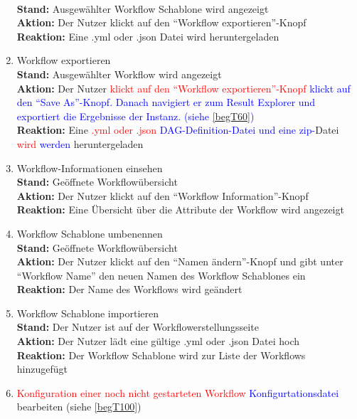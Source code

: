 \begin{enumerate}
        \\ \textbf{Stand:} Ausgewählter \gls{Workflow Schablone} wird angezeigt
        \\ \textbf{Aktion:} Der \gls{Nutzer} klickt auf den \enquote{Workflow exportieren}-Knopf
        \\ \textbf{Reaktion:} Eine .yml oder .json Datei wird heruntergeladen
    \item \gls{Workflow} exportieren
        \\ \textbf{Stand:} Ausgewählter \gls{Workflow} wird angezeigt
        \\ \textbf{Aktion:} Der \gls{Nutzer} \textcolor{red}{klickt auf den \enquote{Workflow exportieren}-Knopf} \textcolor{blue}{klickt auf den \enquote{Save As}-Knopf. Danach navigiert er zum Result Explorer und exportiert die Ergebnisse der Instanz. (siehe \ref{begT60})}
        \\ \textbf{Reaktion:} Eine \textcolor{red}{.yml oder .json} \textcolor{blue}{DAG-Definition-Datei und eine zip-}Datei \textcolor{red}{wird} \textcolor{blue}{werden} heruntergeladen
    \item \gls{Workflow}-Informationen einsehen
        \\ \textbf{Stand:} Geöffnete Workflowübersicht
        \\ \textbf{Aktion:} Der \gls{Nutzer} klickt auf den \enquote{Workflow Information}-Knopf
        \\ \textbf{Reaktion:} Eine Übersicht über die Attribute der \gls{Workflow} wird angezeigt
    \item \gls{Workflow Schablone} umbenennen
        \\ \textbf{Stand:} Geöffnete Workflowübersicht
        \\ \textbf{Aktion:} Der \gls{Nutzer} klickt auf den \enquote{Namen ändern}-Knopf und gibt unter \enquote{Workflow Name} den neuen Namen des \glspl{Workflow Schablone} ein
        \\ \textbf{Reaktion:} Der Name des Workflows wird geändert
    \item \gls{Workflow Schablone} importieren
        \\ \textbf{Stand:} Der \gls{Nutzer} ist auf der Workflowerstellungsseite 
        \\ \textbf{Aktion:} Der \gls{Nutzer} lädt eine gültige .yml oder .json Datei hoch 
        \\ \textbf{Reaktion:} Der \gls{Workflow Schablone} wird zur Liste der Workflows hinzugefügt
    \item \textcolor{red}{Konfiguration einer noch nicht gestarteten \gls{Workflow}} \textcolor{blue}{Konfigurtationsdatei} bearbeiten (siehe \ref{begT100}) 

\end{enumerate}
